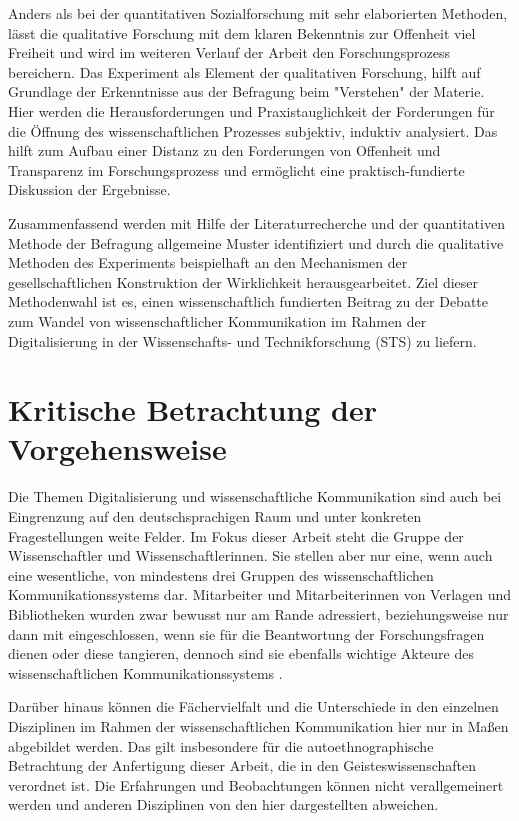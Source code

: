 Anders als bei der quantitativen Sozialforschung mit sehr elaborierten Methoden,
lässt die qualitative Forschung mit dem klaren Bekenntnis zur Offenheit viel Freiheit und wird im weiteren Verlauf der Arbeit den Forschungsprozess bereichern. Das Experiment als Element der qualitativen Forschung, hilft auf Grundlage der Erkenntnisse aus der Befragung beim "Verstehen" der Materie. Hier werden die Herausforderungen und Praxistauglichkeit der Forderungen für die Öffnung des wissenschaftlichen Prozesses subjektiv, induktiv analysiert. Das hilft zum Aufbau einer Distanz zu den Forderungen von Offenheit und Transparenz im Forschungsprozess und ermöglicht eine praktisch-fundierte Diskussion der Ergebnisse.

Zusammenfassend werden mit Hilfe der Literaturrecherche und der quantitativen Methode der Befragung allgemeine Muster identifiziert und durch die qualitative Methoden des Experiments beispielhaft an den Mechanismen der gesellschaftlichen Konstruktion der Wirklichkeit herausgearbeitet. Ziel dieser Methodenwahl ist es, einen wissenschaftlich fundierten Beitrag zu der Debatte zum Wandel von wissenschaftlicher Kommunikation im Rahmen der Digitalisierung in der Wissenschafts- und Technikforschung (STS) zu liefern.

\section{Kritische Betrachtung der Vorgehensweise}

Die Themen Digitalisierung und wissenschaftliche Kommunikation sind auch bei Eingrenzung auf den deutschsprachigen Raum und unter konkreten Fragestellungen weite Felder. Im Fokus dieser Arbeit steht die Gruppe der Wissenschaftler und Wissenschaftlerinnen. Sie stellen aber nur eine, wenn auch eine wesentliche, von mindestens drei Gruppen des wissenschaftlichen Kommunikationssystems dar. Mitarbeiter und Mitarbeiterinnen von Verlagen und Bibliotheken wurden zwar bewusst nur am Rande adressiert, beziehungsweise nur dann mit eingeschlossen, wenn sie für die Beantwortung der Forschungsfragen dienen oder diese tangieren, dennoch sind sie ebenfalls wichtige Akteure des wissenschaftlichen Kommunikationssystems \cite{suchen}.

Darüber hinaus können die Fächervielfalt und die Unterschiede in den einzelnen Disziplinen im Rahmen der wissenschaftlichen Kommunikation hier nur in Maßen abgebildet werden. Das gilt insbesondere für die autoethnographische Betrachtung der Anfertigung dieser Arbeit, die in den Geisteswissenschaften verordnet ist. Die Erfahrungen und Beobachtungen können nicht verallgemeinert werden und anderen Disziplinen von den hier dargestellten abweichen.

